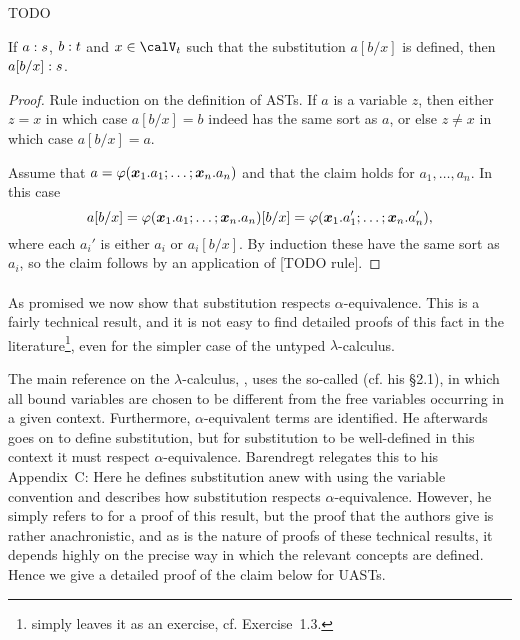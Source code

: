 \documentclass[a4paper, 11pt, article, danish, oneside]{memoir}
\renewcommand{\phi}{\varphi}
\newcommand{\newpar}{\paragraph{}}
\newcommand{\setVar}{\calV}
\begin{document}
\begin{lemma}
    \label{lem:substitution-lemma}
    TODO
\end{lemma}


\begin{lemma}
    If $a : s$, $b : t$ and $x \in \setVar_t$ such that the substitution $a[b/x]$ is defined, then $a[b/x] : s$.
\end{lemma}

\begin{proof}
    Rule induction on the definition of ASTs. If $a$ is a variable $z$, then either $z = x$ in which case $a[b/x] = b$ indeed has the same sort as $a$, or else $z \neq x$ in which case $a[b/x] = a$.

    Assume that $a = \phi(\seq{x}_1.a_1 ; \ldots ; \seq{x}_n.a_n)$ and that the claim holds for $a_1, \ldots, a_n$. In this case
    \begin{equation*}
        a[b/x]
            = \phi(\seq{x}_1.a_1 ; \ldots ; \seq{x}_n.a_n)[b/x]
            = \phi(\seq{x}_1.a_1' ; \ldots ; \seq{x}_n.a_n'),
    \end{equation*}
    where each $a_i'$ is either $a_i$ or $a_i[b/x]$. By induction these have the same sort as $a_i$, so the claim follows by an application of [TODO rule].
\end{proof}


\newpar

As promised we now show that substitution respects $\alpha$-equivalence. This is a fairly technical result, and it is not easy to find detailed proofs of this fact in the literature\footnote{\Textcite{harper-pl} simply leaves it as an exercise, cf. Exercise~1.3.}, even for the simpler case of the untyped $\lambda$-calculus.

The main reference on the $\lambda$-calculus, \textcite{barendregt-lambda}, uses the so-called  (cf. his §2.1), in which all bound variables are chosen to be different from the free variables occurring in a given context. Furthermore, $\alpha$-equivalent terms are identified. He afterwards goes on to define substitution, but for substitution to be well-defined in this context it must respect $\alpha$-equivalence. Barendregt relegates this to his Appendix~C: Here he defines substitution anew with using the variable convention and describes how substitution respects $\alpha$-equivalence. However, he simply refers to \textcite[§3.E]{curry-combinatory} for a proof of this result, but the proof that the authors give is rather anachronistic, and as is the nature of proofs of these technical results, it depends highly on the precise way in which the relevant concepts are defined. Hence we give a detailed proof of the claim below for UASTs.
\end{document}
